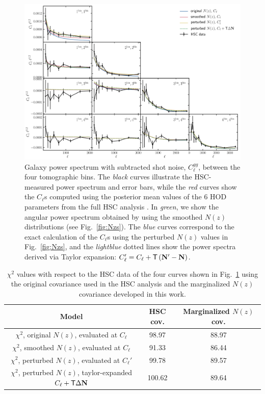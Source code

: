 \documentclass[a4paper,11pt]{article}
\newcommand{\vN}{\mathbf{N}}
\begin{document}
\begin{figure}[ht]
\centering  
\includegraphics[width=1.\textwidth]{./Cls}
\caption{Galaxy power spectrum with subtracted shot noise, $C_\ell^{gg}$, between the four
tomographic bins. The \textit{black} curves illustrate the HSC-measured
power spectrum and error bars, while the
\textit{red} curves show the $C_\ell$s
computed using the posterior mean values
of the 6 HOD parameters from the
full HSC analysis \cite{1912.08209}. In 
\textit{green}, we show the angular power
spectrum obtained by using the smoothed
$N(z)$ distributions (see Fig.~\ref{fig:Nzs}). The \textit{blue}
curves correspond to the exact
calculation of the $C_\ell$s using the
perturbed $N(z)$ values in
Fig.~\ref{fig:Nzs}, and the 
\textit{lightblue} dotted lines
show the power spectra derived via
Taylor expansion: $C_\ell' = C_\ell +
 {\sf T} \left(\vN' - {\vN} \right)$.}
\label{fig:Cls}
\end{figure}

\begin{table}
\begin{center}
 \begin{tabular}{c | c c } 
 \hline\hline
 Model & HSC cov. & Marginalized $N(z)$ cov. \\ [0.5ex] 
 \hline
  $\chi^2$, original $N(z)$, evaluated at $C_\ell$ & 98.97 & 88.97 \\ 

 $\chi^2$, smoothed $N(z)$, evaluated at $C_\ell$ & 91.33 & 86.44 \\

 $\chi^2$, perturbed $N(z)$, evaluated at $C_\ell'$ & 99.78 & 89.57 \\

 $\chi^2$, perturbed $N(z)$, taylor-expanded $C_\ell +
 {\sf T} \Delta \vN$ & 100.62 & 89.64 \\
 
 \hline
 \hline
\end{tabular}
\end{center}
\caption{$\chi^2$ values with respect to the HSC data of the 
four curves shown in Fig.~\ref{fig:Cls} using the original 
covariance used in the HSC analysis and the marginalized
$N(z)$ covariance developed in this work.}
\label{tab:lin}
\end{table}
\end{document}

